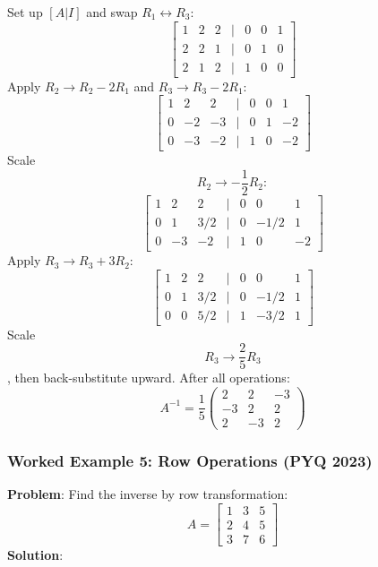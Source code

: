 \documentclass[
]{article}
\begin{document}
Set up \([A \lvert  I]\) and swap \(R_1 \leftrightarrow R_3\):
\[
\begin{bmatrix}
1 & 2 & 2 & | & 0 & 0 & 1 \\
2 & 2 & 1 & | & 0 & 1 & 0 \\
2 & 1 & 2 & | & 1 & 0 & 0
\end{bmatrix}
\]
Apply \(R_2 \to R_2 - 2R_1\) and \(R_3 \to R_3 - 2R_1\):
\[
\begin{bmatrix}
1 & 2 & 2 & | & 0 & 0 & 1 \\
0 & -2 & -3 & | & 0 & 1 & -2 \\
0 & -3 & -2 & | & 1 & 0 & -2
\end{bmatrix}
\]
Scale
\[
R_2 \to -\frac{1}{2}R_2:
\]
\[
\begin{bmatrix}
1 & 2 & 2 & | & 0 & 0 & 1 \\
0 & 1 & 3/2 & | & 0 & -1/2 & 1 \\
0 & -3 & -2 & | & 1 & 0 & -2
\end{bmatrix}
\]
Apply \(R_3 \to R_3 + 3R_2\):
\[
\begin{bmatrix}
1 & 2 & 2 & | & 0 & 0 & 1 \\
0 & 1 & 3/2 & | & 0 & -1/2 & 1 \\
0 & 0 & 5/2 & | & 1 & -3/2 & 1
\end{bmatrix}
\]
Scale
\[
R_3 \to \frac{2}{5}R_3
\]
, then back-substitute upward. After all operations:
\[
A^{-1} = \frac{1}{5}
\begin{pmatrix}
2 & 2 & -3 \\
-3 & 2 & 2 \\
2 & -3 & 2
\end{pmatrix}
\]

\subsubsection{Worked Example 5: Row Operations (PYQ
2023)}\label{worked-example-5-row-operations-pyq-2023}

\textbf{Problem}: Find the inverse by row transformation:
\[
A =
\begin{bmatrix}
1 & 3 & 5 \\
2 & 4 & 5 \\
3 & 7 & 6
\end{bmatrix}
\]
\textbf{Solution}:
\end{document}
